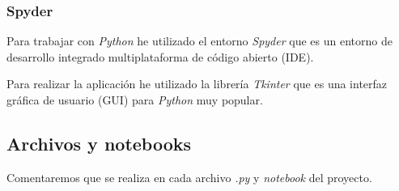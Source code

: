 \subsubsection{Spyder}

Para trabajar con \textit{Python} he utilizado el entorno \textit{Spyder} que es un entorno de desarrollo integrado multiplataforma de código abierto (IDE).

Para realizar la aplicación he utilizado la librería \textit{Tkinter} que es una interfaz gráfica de usuario (GUI) para \textit{Python} muy popular.

\subsection{Archivos y notebooks}

Comentaremos que se realiza en cada archivo \textit{.py} y \textit{notebook} del proyecto.

